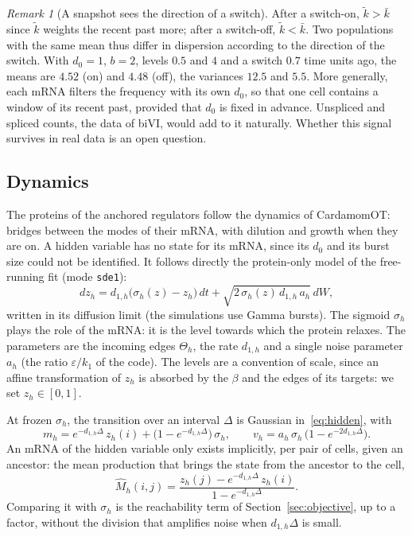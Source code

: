 \documentclass[a4paper, 11pt]{article}
\theoremstyle{plain}
\theoremstyle{remark}
\newtheorem{rem}{Remark}
\begin{document}
\begin{rem}[A snapshot sees the direction of a switch]
After a switch-on, $\tilde k > \bar k$ since $\tilde k$ weights the recent past more; after a switch-off, $\tilde k < \bar k$. Two populations with the same mean thus differ in dispersion according to the direction of the switch. With $d_0 = 1$, $b = 2$, levels $0.5$ and $4$ and a switch $0.7$ time units ago, the means are $4.52$ (on) and $4.48$ (off), the variances $12.5$ and $5.5$. More generally, each mRNA filters the frequency with its own $d_0$, so that one cell contains a window of its recent past, provided that $d_0$ is fixed in advance. Unspliced and spliced counts, the data of biVI, would add to it naturally. Whether this signal survives in real data is an open question.
\end{rem}

\subsection{Dynamics}\label{sec:dynamics}

The proteins of the anchored regulators follow the dynamics of CardamomOT: bridges between the modes of their mRNA, with dilution and growth when they are on. A hidden variable has no state for its mRNA, since its $d_0$ and its burst size could not be identified. It follows directly the protein-only model of the free-running fit (mode \texttt{sde1}):
\begin{equation}\label{eq:hidden}
dz_h = d_{1,h}\big(\sigma_h(z) - z_h\big)\, dt + \sqrt{2\, \sigma_h(z)\, d_{1,h}\, a_h}\, dW,
\end{equation}
written in its diffusion limit (the simulations use Gamma bursts). The sigmoid $\sigma_h$ plays the role of the mRNA: it is the level towards which the protein relaxes. The parameters are the incoming edges $\Theta_h$, the rate $d_{1,h}$ and a single noise parameter $a_h$ (the ratio $\varepsilon / k_1$ of the code). The levels are a convention of scale, since an affine transformation of $z_h$ is absorbed by the $\beta$ and the edges of its targets: we set $z_h \in [0,1]$.

At frozen $\sigma_h$, the transition over an interval $\Delta$ is Gaussian in~\eqref{eq:hidden}, with
\begin{equation}\label{eq:transition}
m_h = e^{-d_{1,h}\Delta}\, z_h(i) + \big(1 - e^{-d_{1,h}\Delta}\big)\, \sigma_h, \qquad
v_h = a_h\, \sigma_h\, \big(1 - e^{-2 d_{1,h}\Delta}\big).
\end{equation}
An mRNA of the hidden variable only exists implicitly, per pair of cells, given an ancestor: the mean production that brings the state from the ancestor to the cell,
\begin{equation}\label{eq:implied}
\widehat M_h(i,j) = \frac{z_h(j) - e^{-d_{1,h}\Delta}\, z_h(i)}{1 - e^{-d_{1,h}\Delta}} .
\end{equation}
Comparing it with $\sigma_h$ is the reachability term of Section~\ref{sec:objective}, up to a factor, without the division that amplifies noise when $d_{1,h}\Delta$ is small.
\end{document}
